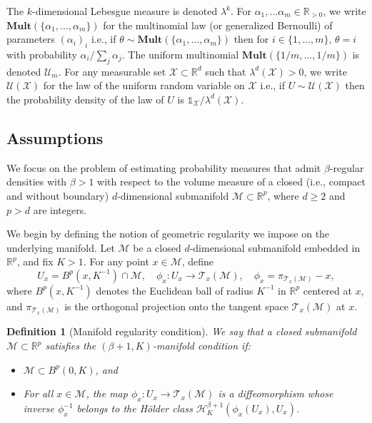 \documentclass[10pt]{article}
\newtheorem{definition}{Definition}
\begin{document}
The $k$-dimensional Lebesgue measure is denoted $\lambda^k$. For $\alpha_1,...\alpha_m\in \mathbb{R}_{>0}$, we write $ \textbf{Mult}(\{\alpha_1,...,\alpha_m\})$ for the multinomial law (or generalized Bernoulli) of parameters $(\alpha_i)_i$ i.e., if $\theta\sim \textbf{Mult}(\{\alpha_1,...,\alpha_m\})$ then for $i\in \{1,...,m\}$, $\theta=i$ with probability $\alpha_i/\sum_j \alpha_j$. The uniform multinomial $\textbf{Mult}(\{1/m,...,1/m\})$  is denoted $\mathcal{U}_m$. For any measurable set $\mathcal{X}\subset \mathbb{R}^d$ such that $\lambda^d(\mathcal{X})>0$, we write $\mathcal{U}(\mathcal{X})$ for the law of the uniform random variable on $\mathcal{X}$ i.e., if $U\sim \mathcal{U}(\mathcal{X})$ then the probability density of the law of $U$ is $\mathds{1}_{\mathcal{X}}/\lambda^d(\mathcal{X})$.


\subsection{Assumptions}

We focus on the problem of estimating probability measures that admit $\beta$-regular densities with $\beta > 1$ with respect to the volume measure of a closed (i.e., compact and without boundary) $d$-dimensional submanifold $\mathcal{M} \subset \mathbb{R}^p$, where $d \geq 2$ and $p > d$ are integers.

We begin by defining the notion of geometric regularity we impose on the underlying manifold. Let $\mathcal{M}$ be a closed $d$-dimensional submanifold embedded in $\mathbb{R}^p$, and fix $K > 1$. For any point $x \in \mathcal{M}$, define
\begin{equation}\label{eq:phix}
    U_x = B^p(x, K^{-1}) \cap \mathcal{M}, \quad \phi_x: U_x \rightarrow \mathcal{T}_x(\mathcal{M}), \quad \phi_x = \pi_{\mathcal{T}_x(\mathcal{M})} - x,
\end{equation}
where $B^p(x, K^{-1})$ denotes the Euclidean ball of radius $K^{-1}$ in $\mathbb{R}^p$ centered at $x$, and $\pi_{\mathcal{T}_x(\mathcal{M})}$ is the orthogonal projection onto the tangent space $\mathcal{T}_x(\mathcal{M})$ at $x$.

\begin{definition}[Manifold regularity condition]\label{def:manifoldcond}
    We say that a closed submanifold $\mathcal{M} \subset \mathbb{R}^p$ satisfies the $(\beta+1, K)$-manifold condition if:
    \begin{itemize}
        \item $\mathcal{M} \subset B^p(0, K)$, and
        \item For all $x \in \mathcal{M}$, the map $\phi_x: U_x \to \mathcal{T}_x(\mathcal{M})$ is a diffeomorphism whose inverse $\phi_x^{-1}$ belongs to the Hölder class $\mathcal{H}_K^{\beta+1}(\phi_x(U_x), U_x)$.
    \end{itemize}
\end{definition}
\end{document}
